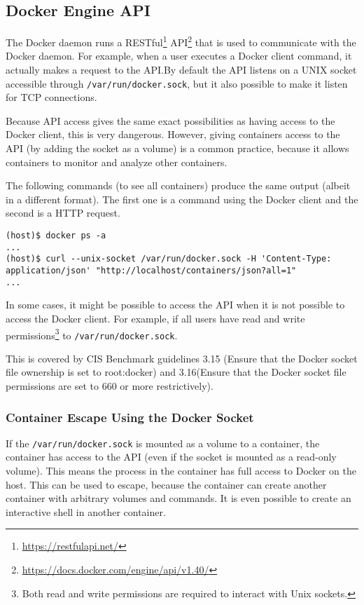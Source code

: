 \subsection{Docker Engine API}\label{subsection:api}

The Docker daemon runs a RESTful\footnote{\url{https://restfulapi.net/}} API\footnote{\url{https://docs.docker.com/engine/api/v1.40/}} that is used to communicate with the Docker daemon. For example, when a user executes a Docker client command, it actually makes a request to the API.\@ By default the API listens on a UNIX socket accessible through \lstinline{/var/run/docker.sock}, but it also possible to make it listen for TCP connections.

\medskip

Because API access gives the same exact possibilities as having access to the Docker client, this is very dangerous\cite{The-Dangers-Of-Docker-Sock}. However, giving containers access to the API (by adding the socket as a volume) is a common practice, because it allows containers to monitor and analyze other containers.

\hfill

The following commands (to see all containers) produce the same output (albeit in a different format). The first one is a command using the Docker client and the second is a HTTP request.
\begin{lstlisting}[caption={Docker client and Socket.},captionpos=b]
(host)$ docker ps -a
...
(host)$ curl --unix-socket /var/run/docker.sock -H 'Content-Type: application/json' "http://localhost/containers/json?all=1"
...
\end{lstlisting}

\hfill

In some cases, it might be possible to access the API when it is not possible to access the Docker client. For example, if all users have read and write permissions\footnote{Both read and write permissions are required to interact with Unix sockets.} to \lstinline{/var/run/docker.sock}.

\hfill

This is covered by CIS Benchmark guidelines 3.15 (Ensure that the Docker socket file ownership is set to root:docker) and 3.16(Ensure that the Docker socket file permissions are set to 660 or more restrictively).

\subsubsection{Container Escape Using the Docker Socket}
If the \lstinline{/var/run/docker.sock} is mounted as a volume to a container, the container has access to the API (even if the socket is mounted as a read-only volume\cite{The-Dangers-Of-Docker-Sock}\cite{Read-Only-Docker-Socket-Tweet}\cite{Read-Only-Docker-Socket-Hackernews}). This means the process in the container has full access to Docker on the host. This can be used to escape, because the container can create another container with arbitrary volumes and commands. It is even possible to create an interactive shell in another container\cite{Escape-Socket-Shell}.

